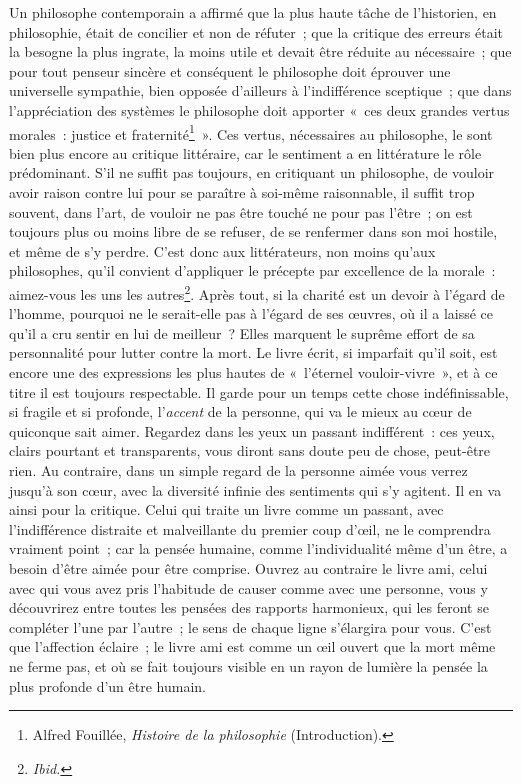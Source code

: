 \documentclass[french,twoside]{book} %
\begin{document}
Un philosophe contemporain a affirmé que la plus haute tâche de l’historien, en philosophie, était de concilier et non de réfuter ; que la critique des erreurs était la besogne la plus ingrate, la moins utile et devait être réduite au nécessaire ; que pour tout penseur sincère et conséquent le philosophe doit éprouver une universelle sympathie, bien opposée d’ailleurs à l’indifférence sceptique ; que dans l’appréciation des systèmes le philosophe doit apporter « ces deux grandes vertus morales : justice et fraternité\footnote{ Alfred Fouillée, \emph{Histoire de la philosophie} (Introduction).} ». Ces vertus, nécessaires au philosophe, le sont bien plus encore au critique littéraire, car le sentiment a en littérature le rôle prédominant. S’il ne suffit pas toujours, en critiquant un philosophe, de vouloir avoir raison contre lui pour se paraître à soi-même raisonnable, il suffit trop souvent, dans l’art, de vouloir ne pas être touché ne pour pas l’être ; on est toujours plus ou moins libre de se refuser, de se renfermer dans son moi hostile, et même de s’y perdre. C’est donc aux littérateurs, non moins qu’aux philosophes, qu’il convient d’appliquer le précepte par excellence de la morale : aimez-vous les uns les autres\footnote{\emph{Ibid.}}. Après tout, si la charité est un devoir à l’égard de l’homme, pourquoi ne le serait-elle pas à l’égard de ses œuvres, où il a laissé ce qu’il a cru sentir en lui de meilleur ? Elles marquent le suprême effort de sa personnalité pour lutter contre la mort. Le livre écrit, si imparfait qu’il soit, est encore une des expressions les plus hautes de « l’éternel vouloir-vivre », et à ce titre il est toujours respectable. Il garde pour un temps cette chose indéfinissable, si fragile et si profonde, l’\emph{accent} de la personne, qui va le mieux au cœur de quiconque sait aimer. Regardez dans les yeux un passant indifférent : ces yeux, clairs pourtant et transparents, vous diront sans doute peu de chose, peut-être rien. Au contraire, dans un simple regard de la personne aimée vous verrez jusqu’à son cœur, avec la diversité infinie des sentiments qui s’y agitent. Il en va ainsi pour la critique. Celui qui traite un livre comme un passant, avec l’indifférence distraite et malveillante du premier coup d’œil, ne le comprendra vraiment point ; car la pensée humaine, comme l’individualité même d’un être, a besoin d’être aimée pour être comprise. Ouvrez au contraire le livre ami, celui avec qui vous avez pris l’habitude de causer comme avec une personne, vous y découvrirez entre toutes les pensées des rapports harmonieux, qui les feront se compléter l’une par l’autre ; le sens de chaque ligne s’élargira pour vous. C’est que l’affection éclaire ; le livre ami est comme un œil ouvert que la mort même ne ferme pas, et où se fait toujours visible en un rayon de lumière la pensée la plus profonde d’un être humain.\par
\end{document}
